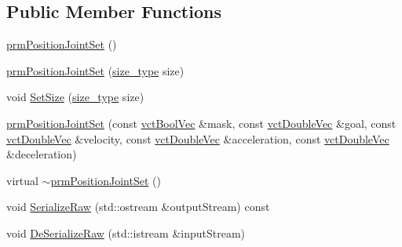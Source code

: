 \subsection*{Public Member Functions}
\begin{DoxyCompactItemize}
\item 
\hyperlink{classprm_position_joint_set_a5ba3988fc2cda63a186196b023b87d95}{prm\+Position\+Joint\+Set} ()
\item 
\hyperlink{classprm_position_joint_set_a49edcaad1c444e73dd95e434a5eae2a6}{prm\+Position\+Joint\+Set} (\hyperlink{classprm_position_joint_set_a66e5a37bee0bb819b63270879d3ab08f}{size\+\_\+type} size)
\item 
void \hyperlink{classprm_position_joint_set_a213f2fdfe598daebe9601e6cd02c40b1}{Set\+Size} (\hyperlink{classprm_position_joint_set_a66e5a37bee0bb819b63270879d3ab08f}{size\+\_\+type} size)
\item 
\hyperlink{classprm_position_joint_set_a9a7d85174985ed253126a3850bf3a56d}{prm\+Position\+Joint\+Set} (const \hyperlink{vct_dynamic_vector_types_8h_aeb2237c134aee3769198bd9d55c8a9e0}{vct\+Bool\+Vec} \&mask, const \hyperlink{vct_dynamic_vector_types_8h_ade4b3068c86fb88f41af2e5187e491c2}{vct\+Double\+Vec} \&goal, const \hyperlink{vct_dynamic_vector_types_8h_ade4b3068c86fb88f41af2e5187e491c2}{vct\+Double\+Vec} \&velocity, const \hyperlink{vct_dynamic_vector_types_8h_ade4b3068c86fb88f41af2e5187e491c2}{vct\+Double\+Vec} \&acceleration, const \hyperlink{vct_dynamic_vector_types_8h_ade4b3068c86fb88f41af2e5187e491c2}{vct\+Double\+Vec} \&deceleration)
\item 
virtual \hyperlink{classprm_position_joint_set_a5de7dbbd11b53a1578ba4b1a83f1f20b}{$\sim$prm\+Position\+Joint\+Set} ()
\item 
void \hyperlink{classprm_position_joint_set_a8278a4ae753257ef0f23ec502c1d8f11}{Serialize\+Raw} (std\+::ostream \&output\+Stream) const 
\item 
void \hyperlink{classprm_position_joint_set_ab9dbbdba641c2bbd31255a4acb991674}{De\+Serialize\+Raw} (std\+::istream \&input\+Stream)
\end{DoxyCompactItemize}

